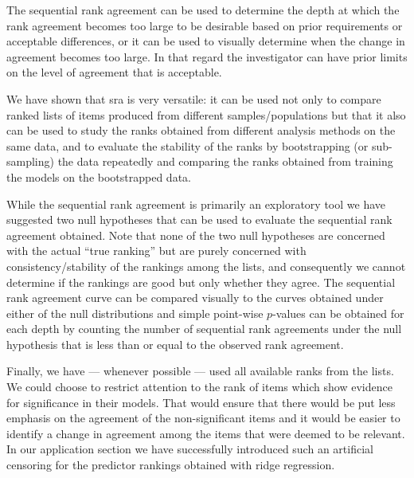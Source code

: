 \documentclass[oupdraft]{bio}
\begin{document}
The sequential rank agreement can be used to determine the depth at
which the rank agreement becomes too large to be desirable based on
prior requirements or acceptable differences, or it can be used to
visually determine when the change in agreement becomes too large.  In
that regard the investigator can have prior limits on the level of
agreement that is acceptable.

We have shown that sra is very versatile: it can be used not only to
compare ranked lists of items produced from different
samples/populations but that it also can be used to study the ranks
obtained from different analysis methods on the same data, and to
evaluate the stability of the ranks by bootstrapping (or sub-sampling)
the data repeatedly and comparing the ranks obtained from training the
models on the bootstrapped data.

While the sequential rank agreement is primarily an exploratory tool
we have suggested two null hypotheses that can be used to evaluate the
sequential rank agreement obtained. Note that none of the two null
hypotheses are concerned with the actual ``true ranking'' but are
purely concerned with consistency/stability of the rankings among the
lists, and consequently we cannot determine if the rankings are good but only
whether they agree. The sequential rank agreement curve can be
compared visually to the curves obtained under either of the null
distributions and simple point-wise $p$-values can be obtained for
each depth by counting the number of sequential rank agreements under
the null hypothesis that is less than or equal to the observed rank
agreement.

Finally, we have --- whenever possible --- used all available ranks
from the lists.  We could choose to restrict attention to the rank of
items which show evidence for significance in their models. That would
ensure that there would be put less emphasis on the agreement of the
non-significant items and it would be easier to identify a change in
agreement among the items that were deemed to be relevant. In our
application section we have successfully introduced such an artificial
censoring for the predictor rankings obtained with ridge regression.
\end{document}

